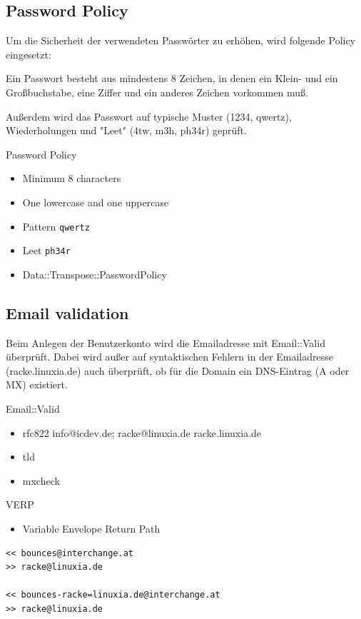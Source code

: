 \subsection{Password Policy}

Um die Sicherheit der verwendeten Passwörter zu erhöhen, wird
folgende Policy eingesetzt:

Ein Passwort besteht aus mindestens 8 Zeichen, in denen
ein Klein- und ein Großbuchstabe, eine Ziffer und ein
anderes Zeichen vorkommen muß.

Außerdem wird das Passwort auf typische Muster (1234, qwertz),
Wiederholungen und "Leet" (4tw, m3h, ph34r) geprüft.

\begin{frame}[fragile]{Password Policy}
\begin{itemize}
\item Minimum 8 characters
\item One lowercase and one uppercase
\item Pattern \verb|qwertz|
\item Leet \verb|ph34r|
\item Data::Transpose::PasswordPolicy
\end{itemize}
\end{frame}

\subsection{Email validation}

Beim Anlegen der Benutzerkonto wird die Emailadresse
mit Email::Valid überprüft. Dabei wird außer auf
syntaktischen Fehlern in der Emailadresse (racke.linuxia.de)
auch überprüft, ob für die Domain ein DNS-Eintrag (A oder MX)
existiert.    
                   
\begin{frame}{Email::Valid}
\begin{itemize}
\item rfc822
info@icdev.de; racke@linuxia.de
racke.linuxia.de
\item tld
\item mxcheck
\end{itemize}
\end{frame}

\begin{frame}[fragile]{VERP}
\begin{itemize}
\item Variable Envelope Return Path
\end{itemize}
\begin{lstlisting}
<< bounces@interchange.at
>> racke@linuxia.de

<< bounces-racke=linuxia.de@interchange.at
>> racke@linuxia.de
\end{lstlisting}
\end{frame}


